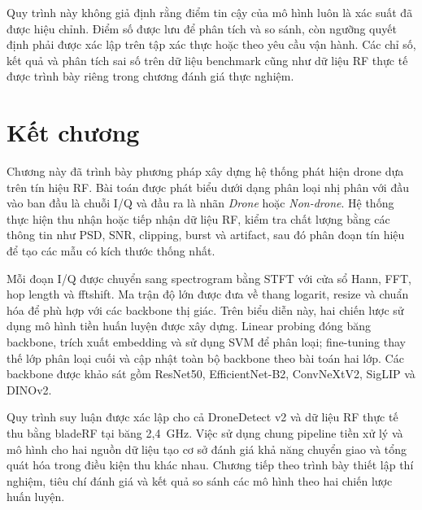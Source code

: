 \documentclass[../DoAn.tex]{subfiles}
\begin{document}
Quy trình này không giả định rằng điểm tin cậy của mô hình luôn là xác suất đã được hiệu chỉnh. Điểm số được lưu để phân tích và so sánh, còn ngưỡng quyết định phải được xác lập trên tập xác thực hoặc theo yêu cầu vận hành. Các chỉ số, kết quả và phân tích sai số trên dữ liệu benchmark cũng như dữ liệu RF thực tế được trình bày riêng trong chương đánh giá thực nghiệm.

\section{Kết chương}

Chương này đã trình bày phương pháp xây dựng hệ thống phát hiện drone dựa trên tín hiệu RF. Bài toán được phát biểu dưới dạng phân loại nhị phân với đầu vào ban đầu là chuỗi I/Q và đầu ra là nhãn \textit{Drone} hoặc \textit{Non-drone}. Hệ thống thực hiện thu nhận hoặc tiếp nhận dữ liệu RF, kiểm tra chất lượng bằng các thông tin như PSD, SNR, clipping, burst và artifact, sau đó phân đoạn tín hiệu để tạo các mẫu có kích thước thống nhất.

Mỗi đoạn I/Q được chuyển sang spectrogram bằng STFT với cửa sổ Hann, FFT, hop length và fftshift. Ma trận độ lớn được đưa về thang logarit, resize và chuẩn hóa để phù hợp với các backbone thị giác. Trên biểu diễn này, hai chiến lược sử dụng mô hình tiền huấn luyện được xây dựng. Linear probing đóng băng backbone, trích xuất embedding và sử dụng SVM để phân loại; fine-tuning thay thế lớp phân loại cuối và cập nhật toàn bộ backbone theo bài toán hai lớp. Các backbone được khảo sát gồm ResNet50, EfficientNet-B2, ConvNeXtV2, SigLIP và DINOv2.

Quy trình suy luận được xác lập cho cả DroneDetect v2 và dữ liệu RF thực tế thu bằng bladeRF tại băng 2,4~GHz. Việc sử dụng chung pipeline tiền xử lý và mô hình cho hai nguồn dữ liệu tạo cơ sở đánh giá khả năng chuyển giao và tổng quát hóa trong điều kiện thu khác nhau. Chương tiếp theo trình bày thiết lập thí nghiệm, tiêu chí đánh giá và kết quả so sánh các mô hình theo hai chiến lược huấn luyện.
\end{document}
